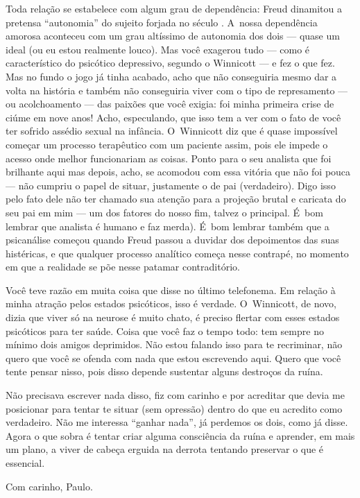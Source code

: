 Toda relação se estabelece com algum grau de dependência: Freud
dinamitou a pretensa ``autonomia'' do sujeito forjada no século . A~nossa dependência amorosa aconteceu com um grau altíssimo de autonomia
dos dois --- quase um ideal (ou eu estou realmente louco). Mas você
exagerou tudo --- como é característico do psicótico depressivo, segundo
o Winnicott --- e fez o que fez. Mas no fundo o jogo já tinha acabado,
acho que não conseguiria mesmo dar a volta na história e também não
conseguiria viver com o tipo de represamento --- ou acolchoamento ---
das paixões que você exigia: foi minha primeira crise de ciúme em nove
anos! Acho, especulando, que isso tem a ver com o fato de você ter
sofrido assédio sexual na infância. O~Winnicott diz que é quase
impossível começar um processo terapêutico com um paciente assim, pois
ele impede o acesso onde melhor funcionariam as coisas. Ponto para o seu
analista que foi brilhante aqui mas depois, acho, se acomodou com essa
vitória que não foi pouca --- não cumpriu o papel de situar, justamente
o de pai (verdadeiro). Digo isso pelo fato dele não ter chamado sua
atenção para a projeção brutal e caricata do seu pai em mim --- um dos
fatores do nosso fim, talvez o principal. É~bom lembrar que analista é
humano e faz merda). É~bom lembrar também que a psicanálise começou
quando Freud passou a duvidar dos depoimentos das suas histéricas, e que
qualquer processo analítico começa nesse contrapé, no momento em que a
realidade se põe nesse patamar contraditório.

Você teve razão em muita coisa que disse no último telefonema. Em
relação à minha atração pelos estados psicóticos, isso é verdade. O~Winnicott, de novo, dizia que viver só na neurose é muito chato, é
preciso flertar com esses estados psicóticos para ter saúde. Coisa que
você faz o tempo todo: tem sempre no mínimo dois amigos deprimidos. Não
estou falando isso para te recriminar, não quero que você se ofenda com
nada que estou escrevendo aqui. Quero que você tente pensar nisso, pois
disso depende sustentar alguns destroços da ruína.

Não precisava escrever nada disso, fiz com carinho e por acreditar que
devia me posicionar para tentar te situar (sem opressão) dentro do que
eu acredito como verdadeiro. Não me interessa ``ganhar nada'', já
perdemos os dois, como já disse. Agora o que sobra é tentar criar alguma
consciência da ruína e aprender, em mais um plano, a viver de cabeça
erguida na derrota tentando preservar o que é essencial.

\medskip{} 
\begin{flushright}Com carinho, Paulo.\end{flushright}




